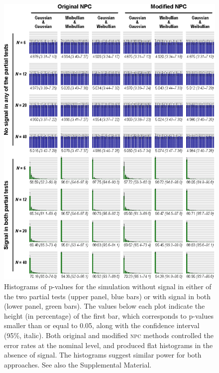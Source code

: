 \begin{figure}[p]
\begin{center}
\centerline{\includegraphics{images/validity_hist.eps}}
\end{center}
\vspace{-3mm}
\caption[Histograms of p-values for the simulations.]{Histograms of p-values for the simulation without signal in either of the two partial tests (upper panel, blue bars) or with signal in both (lower panel, green bars). The values below each plot indicate the height (in percentage) of the first bar, which corresponds to p-values smaller than or equal to 0.05, along with the confidence interval (95\%, italic). Both original and modified \textsc{npc} methods controlled the error rates at the nominal level, and produced flat histograms in the absence of signal. The histograms suggest similar power for both approaches. See also the Supplemental Material.}
\label{fig:validity_hist}
\end{figure}


